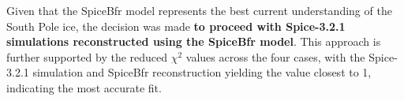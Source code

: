 Given that the SpiceBfr model represents the best current understanding of the South Pole ice, the decision was made \textbf{to proceed with Spice-3.2.1 simulations reconstructed using the SpiceBfr model}. This approach is further supported by the reduced $\chi^2$ values across the four cases, with the Spice-3.2.1 simulation and SpiceBfr reconstruction yielding the value closest to 1, indicating the most accurate fit. 





    

